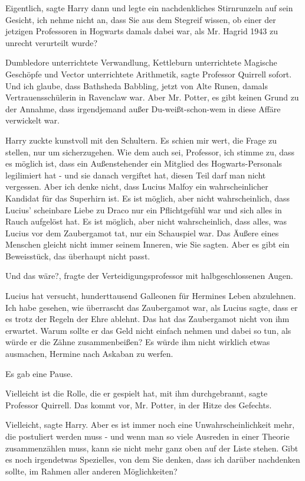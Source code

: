 \glqq Eigentlich\grqq{}, sagte Harry dann und legte ein nachdenkliches
Stirnrunzeln auf sein Gesicht, \glqq ich nehme nicht an, dass Sie aus dem
Stegreif wissen, ob einer der jetzigen Professoren in Hogwarts damals dabei war,
als Mr. Hagrid 1943 zu unrecht verurteilt wurde?\grqq{}

\glqq Dumbledore unterrichtete Verwandlung, Kettleburn unterrichtete Magische
Geschöpfe und Vector unterrichtete Arithmetik\grqq{}, sagte Professor Quirrell
sofort. \glqq Und ich glaube, dass Bathsheda Babbling, jetzt von Alte Runen,
damals Vertrauensschülerin in Ravenclaw war. Aber Mr. Potter, es gibt keinen
Grund zu der Annahme, dass irgendjemand außer Du-weißt-schon-wem in diese Affäre
verwickelt war.\grqq{}

Harry zuckte kunstvoll mit den Schultern. \glqq Es schien mir wert, die Frage zu
stellen, nur um sicherzugehen. Wie dem auch sei, Professor, ich stimme zu, dass
es möglich ist, dass ein Außenstehender ein Mitglied des Hogwarts-Personals
legilimiert hat - und sie danach vergiftet hat, diesen Teil darf man nicht
vergessen. Aber ich denke nicht, dass Lucius Malfoy ein wahrscheinlicher
Kandidat für das Superhirn ist. Es ist möglich, aber nicht wahrscheinlich, dass
Lucius' scheinbare Liebe zu Draco nur ein Pflichtgefühl war und sich alles in
Rauch aufgelöst hat. Es ist möglich, aber nicht wahrscheinlich, dass alles, was
Lucius vor dem Zaubergamot tat, nur ein Schauspiel war. Das Äußere eines
Menschen gleicht nicht immer seinem Inneren, wie Sie sagten. Aber es gibt ein
Beweisstück, das überhaupt nicht passt.\grqq{}

\glqq Und das wäre?\grqq{}, fragte der Verteidigungsprofessor mit
halbgeschlossenen Augen.

\glqq Lucius hat versucht, hunderttausend Galleonen für Hermines Leben
abzulehnen. Ich habe gesehen, wie überrascht das Zaubergamot war, als Lucius
sagte, dass er es trotz der Regeln der Ehre ablehnt. Das hat das Zaubergamot
nicht von ihm erwartet. Warum sollte er das Geld nicht einfach nehmen und dabei
so tun, als würde er die Zähne zusammenbeißen? Es würde ihm nicht wirklich etwas
ausmachen, Hermine nach Askaban zu werfen.\grqq{}

Es gab eine Pause.

\glqq Vielleicht ist die Rolle, die er gespielt hat, mit ihm
durchgebrannt\grqq{}, sagte Professor Quirrell. \glqq Das kommt vor, Mr. Potter,
in der Hitze des Gefechts.\grqq{}

\glqq Vielleicht\grqq{}, sagte Harry. \glqq Aber es ist immer noch eine
Unwahrscheinlichkeit mehr, die postuliert werden muss - und wenn man so viele
Ausreden in einer Theorie zusammenzählen muss, kann sie nicht mehr ganz oben auf
der Liste stehen. Gibt es noch irgendetwas Spezielles, von dem Sie denken, dass
ich darüber nachdenken sollte, im Rahmen aller anderen Möglichkeiten?\grqq{}

